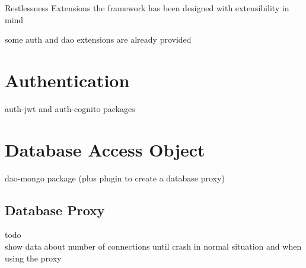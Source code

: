 \begin{chapter}{Restlessness Extensions}
    the framework has been designed with extensibility in mind

    some auth and dao extensions are already provided

    \section{Authentication}
    auth-jwt and auth-cognito packages

    \section{Database Access Object}
    dao-mongo package (plus plugin to create a database proxy)

    \subsection{Database Proxy}
    todo\\
    show data about number of connections until crash in normal
    situation and when using the proxy

\end{chapter}